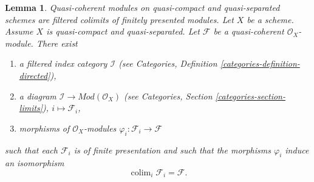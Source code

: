 \documentclass[10pt,a4paper]{amsart}
\newenvironment{slogan}{\comment}{\endcomment}
\theoremstyle{plain}
\newtheorem{lemma}[subsection]{Lemma}
\theoremstyle{definition}
\theoremstyle{remark}
\numberwithin{equation}{subsection}
\def\colim{\mathop{\mathrm{colim}}\nolimits}
\begin{document}
\begin{lemma}
\label{lemma-directed-colimit-diagram-finite-presentation}
\begin{slogan}
Quasi-coherent modules on quasi-compact and quasi-separated schemes
are filtered colimits of finitely presented modules.
\end{slogan}
Let $X$ be a scheme. Assume $X$ is quasi-compact and quasi-separated.
Let $\mathcal{F}$ be a quasi-coherent $\mathcal{O}_X$-module.
There exist
\begin{enumerate}
\item a filtered index category $\mathcal{I}$ (see
Categories, Definition \ref{categories-definition-directed}),
\item a diagram $\mathcal{I} \to \textit{Mod}(\mathcal{O}_X)$ (see
Categories, Section \ref{categories-section-limits}),
$i \mapsto \mathcal{F}_i$,
\item morphisms of $\mathcal{O}_X$-modules
$\varphi_i : \mathcal{F}_i \to \mathcal{F}$
\end{enumerate}
such that each $\mathcal{F}_i$ is of finite presentation
and such that the morphisms $\varphi_i$ induce an isomorphism
$$
\colim_i \mathcal{F}_i
=
\mathcal{F}.
$$
\end{lemma}
\end{document}
